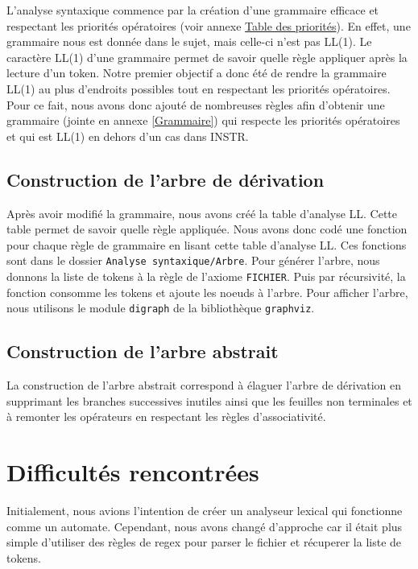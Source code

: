\documentclass[11pt]{article}
\begin{document}
L'analyse syntaxique commence par la création d'une grammaire efficace et respectant les priorités opératoires (voir annexe \hyperref[tab:priorities]{Table des priorités}). En effet, une grammaire nous est donnée dans le sujet, mais celle-ci n'est pas LL(1). Le caractère LL(1) d'une grammaire permet de savoir quelle règle appliquer après la lecture d'un token.
Notre premier objectif a donc été de rendre la grammaire LL(1) au plus d'endroits possibles tout en respectant les priorités opératoires. Pour ce fait, nous avons donc ajouté de nombreuses règles afin d'obtenir une grammaire (jointe en annexe \ref{Grammaire}) qui respecte les priorités opératoires et qui est LL(1) en dehors d'un cas dans INSTR. 

\subsection{Construction de l'arbre de dérivation}

Après avoir modifié la grammaire, nous avons créé la table d'analyse LL. Cette table permet de savoir quelle règle appliquée. Nous avons donc codé une fonction pour chaque règle de grammaire en lisant cette table d'analyse LL. Ces fonctions sont dans le dossier \texttt{Analyse syntaxique/Arbre}. Pour générer l'arbre, nous donnons la liste de tokens à la règle de l'axiome \texttt{FICHIER}. Puis par récursivité, la fonction consomme les tokens et ajoute les noeuds à l'arbre. 
Pour afficher l'arbre, nous utilisons le module \texttt{digraph} de la bibliothèque \texttt{graphviz}. 

\subsection{Construction de l'arbre abstrait}

La construction de l'arbre abstrait correspond à élaguer l'arbre de dérivation en supprimant les branches successives inutiles ainsi que les feuilles non terminales et à remonter les opérateurs en respectant les règles d'associativité. 

\section{Difficultés rencontrées}

Initialement, nous avions l'intention de créer un analyseur lexical qui fonctionne comme un automate. Cependant, nous avons changé d'approche car il était plus simple d'utiliser des règles de regex pour parser le fichier et récuperer la liste de tokens.
\end{document}
